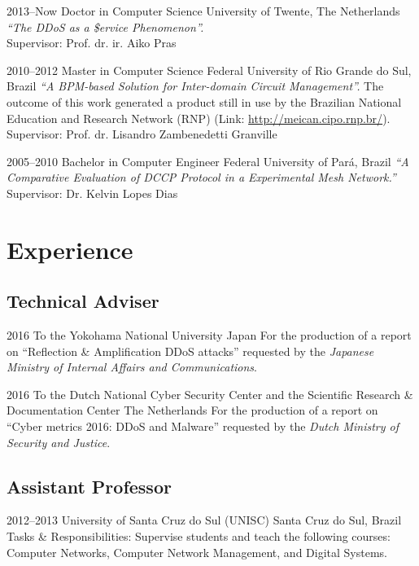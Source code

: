 \documentclass[print]{friggeri-cv} %
\begin{document}
\begin{entrylist}

\entry
{2013--Now}
{Doctor {\normalfont in Computer Science}}
{University of Twente, The Netherlands}
{\emph{``The DDoS as a \$ervice Phenomenon''.} \\
Supervisor: Prof. dr. ir. Aiko Pras 
}	

\entry
{2010--2012}
{Master {\normalfont in Computer Science}}
{Federal University of Rio Grande do Sul, Brazil}
{\emph{``A BPM-based Solution for Inter-domain Circuit Management''.} The outcome of this work generated a product still in use by the Brazilian National Education and Research Network (RNP) (Link: \href{http://meican.cipo.rnp.br/}{http://meican.cipo.rnp.br/}).\\
Supervisor: Prof. dr. Lisandro Zambenedetti Granville}

\entry
{2005--2010}
{Bachelor {\normalfont in Computer Engineer}}
{Federal University of Par\'a, Brazil}
{\emph{``A Comparative Evaluation of DCCP Protocol in a Experimental Mesh Network.''} \\ 
Supervisor: Dr. Kelvin Lopes Dias
}

\end{entrylist}

\section{Experience}

\subsection{Technical Adviser}
\begin{entrylist}
\entry
{2016}
{To the Yokohama National University}
{Japan}
{For the production of a report on ``Reflection \& Amplification DDoS attacks'' requested by the \emph{Japanese Ministry of Internal Affairs and Communications}.}

\entry
{2016}
{To the Dutch National Cyber Security Center and the Scientific Research \& Documentation Center}
{The Netherlands}
{For the production of a report on ``Cyber metrics 2016: DDoS and Malware'' requested by the \emph{Dutch Ministry of Security and Justice}.}
\end{entrylist}

\subsection{Assistant Professor}
\begin{entrylist}
\entry
{2012--2013}
{University of Santa Cruz do Sul (UNISC)}
{Santa Cruz do Sul, Brazil}
{Tasks \& Responsibilities: Supervise students and teach the following courses: Computer Networks, Computer Network Management, and Digital Systems.}
\end{entrylist}
\end{document}
